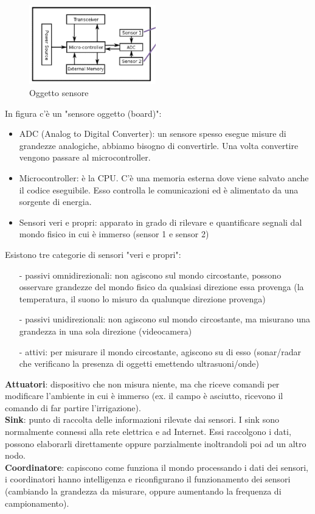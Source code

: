 \documentclass[12pt,italian]{report}
\begin{document}
\begin{figure}[h]
	\centering
    \includegraphics[width=55mm]{img/sensore.PNG}
    \caption{Oggetto sensore}
    \label{fig:se}
\end{figure}

\noindent In figura c'è un "sensore oggetto (board)":
\begin{itemize}
    \item ADC (Analog to Digital Converter): un sensore spesso esegue misure di grandezze analogiche, abbiamo bisogno di convertirle. Una volta convertire vengono passare al microcontroller.
    \item Microcontroller: è la CPU. C'è una memoria esterna dove viene salvato anche il codice eseguibile. Esso controlla le comunicazioni ed è alimentato da una sorgente di energia. 
    \item Sensori veri e propri: apparato in grado di rilevare e quantificare segnali dal mondo fisico in cui è immerso (sensor 1 e sensor 2)

\end{itemize}

\noindent Esistono tre categorie di sensori "veri e propri":
\begin{itemize}
    \item [-] passivi omnidirezionali: non agiscono sul mondo circostante, possono osservare grandezze del mondo fisico da qualsiasi direzione essa provenga (la temperatura, il suono lo misuro da qualunque direzione provenga)
    \item [-] passivi unidirezionali: non agiscono sul mondo circostante, ma misurano una grandezza in una sola direzione (videocamera)
    \item [-] attivi: per misurare il mondo circostante, agiscono su di esso (sonar/radar che verificano la presenza di oggetti emettendo ultrasuoni/onde)
\end{itemize}


\noindent \textbf{Attuatori}: dispositivo che non misura niente, ma che riceve comandi per modificare l'ambiente in cui è immerso (ex. il campo è asciutto, ricevono il comando di far partire l'irrigazione). \\ 
\textbf{Sink}: punto di raccolta delle informazioni rilevate dai sensori. I sink sono normalmente connessi alla rete elettrica e ad Internet. Essi raccolgono i dati, possono elaborarli direttamente oppure parzialmente inoltrandoli poi ad un altro nodo. \\
\textbf{Coordinatore}: capiscono come funziona il mondo processando i dati dei sensori, i coordinatori hanno intelligenza e riconfigurano il funzionamento dei sensori (cambiando la grandezza da misurare, oppure aumentando la frequenza di campionamento). 
\end{document}
